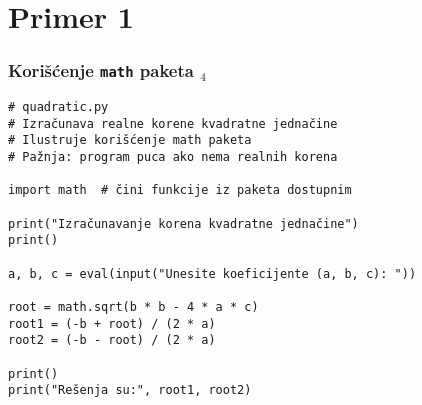\documentclass[utf8,compress,aspectratio=169]{beamer}
\begin{document}


\section{Primer 1}

\begin{frame}[fragile,shrink=5]
  \frametitle{Korišćenje \texttt{math} paketa $_4$}
\begin{verbatim}
# quadratic.py
# Izračunava realne korene kvadratne jednačine
# Ilustruje korišćenje math paketa
# Pažnja: program puca ako nema realnih korena

import math  # čini funkcije iz paketa dostupnim

print("Izračunavanje korena kvadratne jednačine")
print()

a, b, c = eval(input("Unesite koeficijente (a, b, c): "))

root = math.sqrt(b * b - 4 * a * c)
root1 = (-b + root) / (2 * a)
root2 = (-b - root) / (2 * a)

print()
print("Rešenja su:", root1, root2)
\end{verbatim}
\end{frame}
\end{document}
